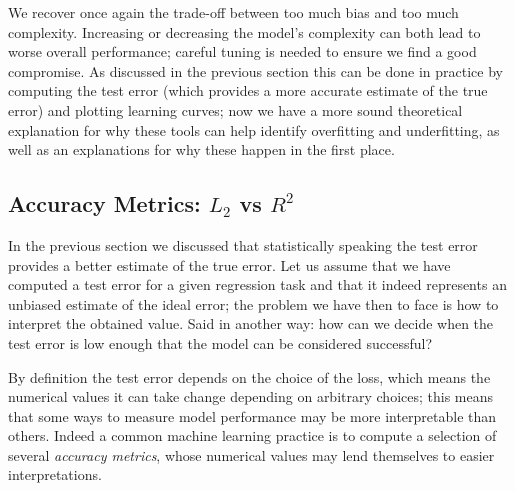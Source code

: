 We recover once again the trade-off between too much bias and too much complexity. Increasing or decreasing the model's complexity can both lead to worse overall performance; careful tuning is needed to ensure we find a good compromise.
As discussed in the previous section this can be done in practice by computing the test error (which provides a more accurate estimate of the true error) and plotting learning curves; now we have a more sound theoretical explanation for why these tools can help identify overfitting and underfitting, as well as an explanations for why these happen in the first place.

\subsection{Accuracy Metrics: $L_2$ vs $R^2$}\label{subsec:accuracy_metrics}


In the previous section we discussed that statistically speaking the test error provides a better estimate of the true error. Let us assume that we have computed a test error for a given regression task and that it indeed represents an unbiased estimate of the ideal error; the problem we have then to face is how to interpret the obtained value.
Said in another way: how can we decide when the test error is low enough that the model can be considered successful?

By definition the test error depends on the choice of the loss, which means the numerical values it can take change depending on arbitrary choices; this means that some ways to measure model performance may be more interpretable than others. Indeed a common machine learning practice is to compute a selection of several \emph{accuracy metrics}, whose numerical values may lend themselves to easier interpretations.

